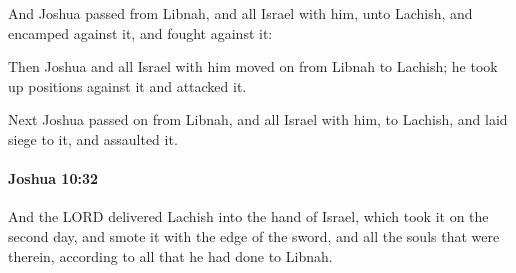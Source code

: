 			\begin{versebox}
					\item[BHS] 
					\item[ASV] And Joshua passed from Libnah, and all Israel with him, unto Lachish, and encamped against it, and fought against it:
					\item[NIV] Then Joshua and all Israel with him moved on from Libnah to Lachish; he took up positions against it and attacked it.
					\item[NRSV] Next Joshua passed on from Libnah, and all Israel with him, to Lachish, and laid siege to it, and assaulted it.
			\end{versebox}

		\paragraph{Joshua 10:32} %
			\label{JOSHUA-10-32}

			And the LORD delivered Lachish into the hand of Israel, which took it on the second day, and smote it with the edge of the sword, and all the souls that were therein, according to all that he had done to Libnah.

